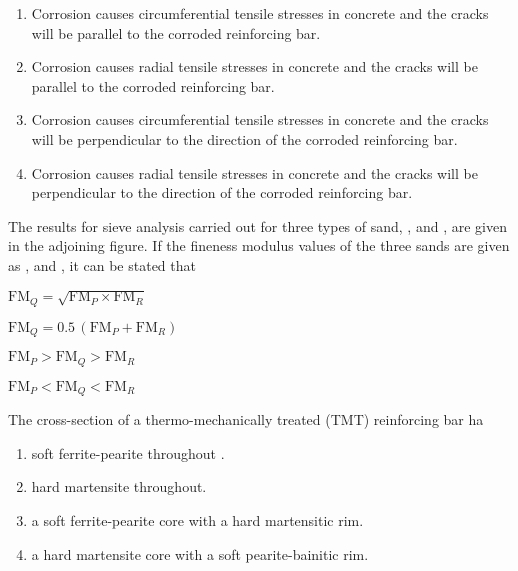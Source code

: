 \begin{enumerate}

\item Corrosion causes circumferential tensile stresses in concrete and the cracks will be parallel to the corroded reinforcing bar.
\item Corrosion causes radial tensile stresses in concrete and the cracks will be parallel to the corroded reinforcing bar.
\item Corrosion causes circumferential tensile stresses in concrete and the cracks will be perpendicular to the direction of the corroded reinforcing bar.
\item Corrosion causes radial tensile stresses in concrete and the cracks will be perpendicular to the direction of the corroded reinforcing bar.
\end{enumerate}
\item The results for sieve analysis carried out for three types of sand, ,  and , are given in the adjoining figure. If the fineness modulus values of the three sands are given as ,  and , it can be stated that
\begin{enumerate}
\begin{multicols}{2}
\item $ \text{FM}_Q = \sqrt{\text{FM}_P \times \text{FM}_R} $
\item $ \text{FM}_Q = 0.5 \, (\text{FM}_P + \text{FM}_R) $
\item $ \text{FM}_P > \text{FM}_Q > \text{FM}_R $
\item $ \text{FM}_P < \text{FM}_Q < \text{FM}_R $
\end{multicols}
\end{enumerate}
\newpage
\item The cross-section of a thermo-mechanically treated (TMT) reinforcing bar ha
\begin{enumerate}
\item soft ferrite-pearite throughout .
\item hard martensite throughout.
\item a soft ferrite-pearite core with a hard martensitic rim.
\item a hard martensite core with a soft pearite-bainitic rim.
\end{enumerate}
